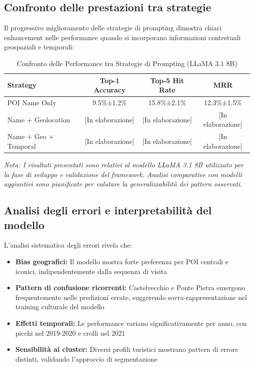 \begin{itemize}
\subsection{Confronto delle prestazioni tra strategie}

Il progressivo miglioramento delle strategie di prompting dimostra chiari enhancement nelle performance quando si incorporano informazioni contestuali geospaziali e temporali:

\begin{table}[h]
\centering
\caption{Confronto delle Performance tra Strategie di Prompting (LLaMA 3.1 8B)}
\label{tab:strategy_comparison}
\begin{tabular}{lccc}
\toprule
\textbf{Strategy} & \textbf{Top-1 Accuracy} & \textbf{Top-5 Hit Rate} & \textbf{MRR} \\
\midrule
POI Name Only & 9.5\%±1.2\% & 15.8\%±2.1\% & 12.3\%±1.5\% \\
Name + Geolocation & [In elaborazione] & [In elaborazione] & [In elaborazione] \\
Name + Geo + Temporal & [In elaborazione] & [In elaborazione] & [In elaborazione] \\
\bottomrule
\end{tabular}
\end{table}

\textit{Nota: I risultati presentati sono relativi al modello LLaMA 3.1 8B utilizzato per la fase di sviluppo e validazione del framework. Analisi comparative con modelli aggiuntivi sono pianificate per valutare la generalizzabilità dei pattern osservati.}

\subsection{Analisi degli errori e interpretabilità del modello}

L'analisi sistematica degli errori rivela che:

\begin{itemize}
\item \textbf{Bias geografici:} Il modello mostra forte preferenza per POI centrali e iconici, indipendentemente dalla sequenza di visita
\item \textbf{Pattern di confusione ricorrenti:} Castelvecchio e Ponte Pietra emergono frequentemente nelle predizioni errate, suggerendo sovra-rappresentazione nel training culturale del modello
\item \textbf{Effetti temporali:} Le performance variano significativamente per anno, con picchi nel 2019-2020 e crolli nel 2021
\item \textbf{Sensibilità ai cluster:} Diversi profili turistici mostrano pattern di errore distinti, validando l'approccio di segmentazione
\end{itemize}


\end{itemize}
